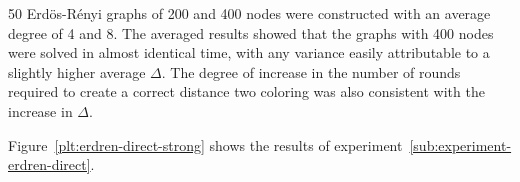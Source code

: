 50 Erd\"{o}s-R\'{e}nyi graphs of 200 and 400 nodes were constructed with an average degree of 4 and 8. The averaged results showed that the graphs with 400 nodes were solved in almost identical time, with any variance easily attributable to a slightly higher average $\Delta$. The degree of increase in the number of rounds required to create a correct distance two coloring was also consistent with the increase in $\Delta$. 

Figure~\ref{plt:erdren-direct-strong} shows the results of experiment~\ref{sub:experiment-erdren-direct}.


